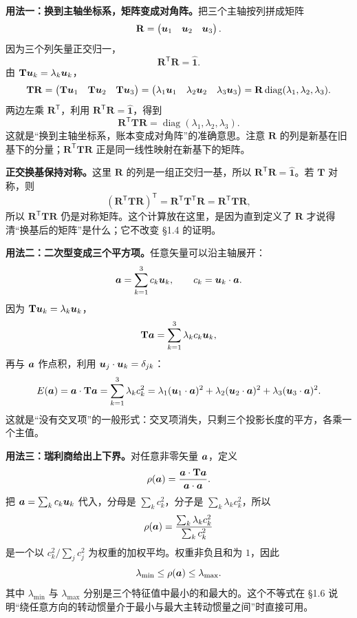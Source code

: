\documentclass[11pt]{ctexart}
\newcommand{\ten}[1]{\mathbf{#1}}
\newcommand{\unitd}{\hat{\ten{1}}}
\begin{document}
\textbf{用法一：换到主轴坐标系，矩阵变成对角阵。}把三个主轴按列拼成矩阵
\[
\ten R=\begin{pmatrix}\vect u_1&\vect u_2&\vect u_3\end{pmatrix}.
\]
因为三个列矢量正交归一，
\[
\ten R^{\mathsf T}\ten R=\unitd .
\]
由 $\ten T\vect u_k=\lambda_k\vect u_k$，
\[
\ten T\ten R
=\begin{pmatrix}\ten T\vect u_1&\ten T\vect u_2&\ten T\vect u_3\end{pmatrix}
=\begin{pmatrix}\lambda_1\vect u_1&\lambda_2\vect u_2&\lambda_3\vect u_3\end{pmatrix}
=\ten R\operatorname{diag}(\lambda_1,\lambda_2,\lambda_3).
\]
两边左乘 $\ten R^{\mathsf T}$，利用 $\ten R^{\mathsf T}\ten R=\unitd$，得到
\[
\ten R^{\mathsf T}\ten T\ten R
=\operatorname{diag}(\lambda_1,\lambda_2,\lambda_3).
\]
这就是“换到主轴坐标系，账本变成对角阵”的准确意思。注意 $\ten R$ 的列是新基在旧基下的分量；$\ten R^{\mathsf T}\ten T\ten R$ 正是同一线性映射在新基下的矩阵。

\textbf{正交换基保持对称。}这里 $\ten R$ 的列是一组正交归一基，所以 $\ten R^{\mathsf T}\ten R=\unitd$。若 $\ten T$ 对称，则
\[
(\ten R^{\mathsf T}\ten T\ten R)^{\mathsf T}
=\ten R^{\mathsf T}\ten T^{\mathsf T}\ten R
=\ten R^{\mathsf T}\ten T\ten R,
\]
所以 $\ten R^{\mathsf T}\ten T\ten R$ 仍是对称矩阵。这个计算放在这里，是因为直到定义了 $\ten R$ 才说得清“换基后的矩阵”是什么；它不改变 §1.4 的证明。

\textbf{用法二：二次型变成三个平方项。}任意矢量可以沿主轴展开：
\[
\boldsymbol{a}=\sum_{k=1}^{3}c_k\boldsymbol{u}_k,
\qquad
c_k=\boldsymbol{u}_k\cdot\boldsymbol{a} .
\]
因为 $\ten T\vect u_k=\lambda_k\vect u_k$，
\[
\ten T\vect a=\sum_{k=1}^{3}\lambda_k c_k\vect u_k,
\]
再与 $\boldsymbol{a}$ 作点积，利用 $\boldsymbol{u}_j\cdot\boldsymbol{u}_k=\delta_{jk}$：
\[
E(\vect a)=\vect a\cdot\ten T\vect a
=\sum_{k=1}^{3}\lambda_k c_k^2
=\lambda_1(\vect u_1\cdot\vect a)^2
+\lambda_2(\vect u_2\cdot\vect a)^2
+\lambda_3(\vect u_3\cdot\vect a)^2 .
\]
这就是“没有交叉项”的一般形式：交叉项消失，只剩三个投影长度的平方，各乘一个主值。

\textbf{用法三：瑞利商给出上下界。}对任意非零矢量 $\boldsymbol{a}$，定义
\[
\rho(\vect a)=\frac{\vect a\cdot\ten T\vect a}{\vect a\cdot\vect a}.
\]
把 $\boldsymbol{a}=\sum_k c_k\boldsymbol{u}_k$ 代入，分母是 $\sum_k c_k^2$，分子是 $\sum_k\lambda_k c_k^2$，所以
\[
\rho(\boldsymbol{a})
=\frac{\sum_k\lambda_k c_k^2}{\sum_k c_k^2}
\]
是一个以 $c_k^2/\sum_j c_j^2$ 为权重的加权平均。权重非负且和为 $1$，因此
\[
\lambda_{\min}\le\rho(\boldsymbol{a})\le\lambda_{\max}.
\]
其中 $\lambda_{\min}$ 与 $\lambda_{\max}$ 分别是三个特征值中最小的和最大的。这个不等式在 §1.6 说明“绕任意方向的转动惯量介于最小与最大主转动惯量之间”时直接可用。
\end{document}
